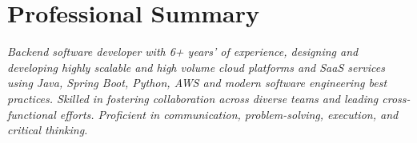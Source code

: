 \section{Professional Summary}
\small
\textit{Backend software developer with 6+ years' of experience, designing and developing highly scalable and high volume cloud platforms and SaaS services using Java, Spring Boot, Python, AWS and modern software engineering best practices. Skilled in fostering collaboration across diverse teams and leading cross-functional efforts. Proficient in communication, problem-solving, execution, and critical thinking.}